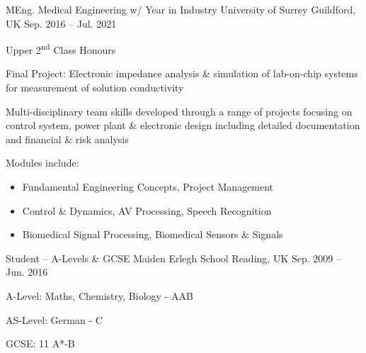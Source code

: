 

\begin{cventries}

  \cventry
    {MEng. Medical Engineering w/ Year in Industry}
    {University of Surrey}
    {Guildford, UK}
    {Sep. 2016 -- Jul. 2021}
    {
      \begin{cvitems}
        \item[] Upper 2\textsuperscript{nd} Class Honours\\
        \item Final Project: Electronic impedance analysis \& simulation of lab-on-chip systems for measurement of solution conductivity
        \item Multi-disciplinary team skills developed through a range of projects focusing on control system, power plant \& electronic design including detailed documentation and financial \& risk analysis\\
        \item[] Modules include:
        \begin{itemize}
            \item Fundamental Engineering Concepts, Project Management
            \item Control \& Dynamics, AV Processing, Speech Recognition
            \item Biomedical Signal Processing, Biomedical Sensors \& Signals
        \end{itemize}
      \end{cvitems}
    }

    \cventry
      {Student -- A-Levels \& GCSE}
      {Maiden Erlegh School}
      {Reading, UK}
      {Sep. 2009 -- Jun. 2016}
      {
        \begin{cvitems}
          \item {A-Level: Maths, Chemistry, Biology - AAB}
          \item {AS-Level: German - C}
          \item {GCSE: 11 A*-B}
        \end{cvitems}
      }

\end{cventries}
